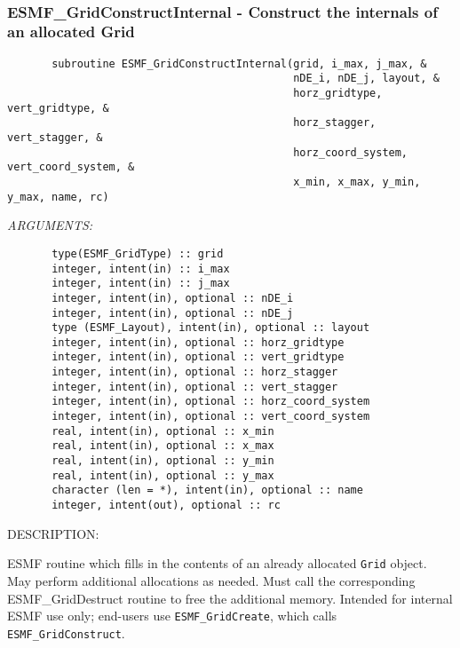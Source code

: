  
\mbox{}\hrulefill\ 
 
\subsubsection{ESMF\_GridConstructInternal - Construct the internals of an allocated Grid}


 
\begin{verbatim}       subroutine ESMF_GridConstructInternal(grid, i_max, j_max, &
                                             nDE_i, nDE_j, layout, &
                                             horz_gridtype, vert_gridtype, &
                                             horz_stagger, vert_stagger, &
                                             horz_coord_system, vert_coord_system, &
                                             x_min, x_max, y_min, y_max, name, rc)\end{verbatim}{\em ARGUMENTS:}
\begin{verbatim}       type(ESMF_GridType) :: grid
       integer, intent(in) :: i_max
       integer, intent(in) :: j_max
       integer, intent(in), optional :: nDE_i
       integer, intent(in), optional :: nDE_j
       type (ESMF_Layout), intent(in), optional :: layout
       integer, intent(in), optional :: horz_gridtype
       integer, intent(in), optional :: vert_gridtype
       integer, intent(in), optional :: horz_stagger
       integer, intent(in), optional :: vert_stagger
       integer, intent(in), optional :: horz_coord_system
       integer, intent(in), optional :: vert_coord_system
       real, intent(in), optional :: x_min
       real, intent(in), optional :: x_max
       real, intent(in), optional :: y_min
       real, intent(in), optional :: y_max
       character (len = *), intent(in), optional :: name
       integer, intent(out), optional :: rc\end{verbatim}
{\sf DESCRIPTION:\\ }


       ESMF routine which fills in the contents of an already
       allocated {\tt Grid} object.  May perform additional allocations
       as needed.  Must call the corresponding ESMF\_GridDestruct
       routine to free the additional memory.  Intended for internal
       ESMF use only; end-users use {\tt ESMF\_GridCreate}, which calls
       {\tt ESMF\_GridConstruct}.
  
